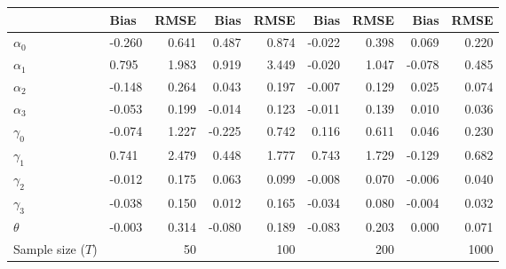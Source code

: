 
\begin{tabular}[t]{llrrrrrrr}
\toprule
  & Bias & RMSE & Bias & RMSE & Bias & RMSE & Bias & RMSE\\
\midrule
$\alpha_{0}$ & -0.260 & 0.641 & 0.487 & 0.874 & -0.022 & 0.398 & 0.069 & 0.220\\
$\alpha_{1}$ & 0.795 & 1.983 & 0.919 & 3.449 & -0.020 & 1.047 & -0.078 & 0.485\\
$\alpha_{2}$ & -0.148 & 0.264 & 0.043 & 0.197 & -0.007 & 0.129 & 0.025 & 0.074\\
$\alpha_{3}$ & -0.053 & 0.199 & -0.014 & 0.123 & -0.011 & 0.139 & 0.010 & 0.036\\
$\gamma_{0}$ & -0.074 & 1.227 & -0.225 & 0.742 & 0.116 & 0.611 & 0.046 & 0.230\\
$\gamma_{1}$ & 0.741 & 2.479 & 0.448 & 1.777 & 0.743 & 1.729 & -0.129 & 0.682\\
$\gamma_{2}$ & -0.012 & 0.175 & 0.063 & 0.099 & -0.008 & 0.070 & -0.006 & 0.040\\
$\gamma_{3}$ & -0.038 & 0.150 & 0.012 & 0.165 & -0.034 & 0.080 & -0.004 & 0.032\\
$\theta$ & -0.003 & 0.314 & -0.080 & 0.189 & -0.083 & 0.203 & 0.000 & 0.071\\
Sample size ($T$) &  & 50 &  & 100 &  & 200 &  & 1000\\
\bottomrule
\end{tabular}
